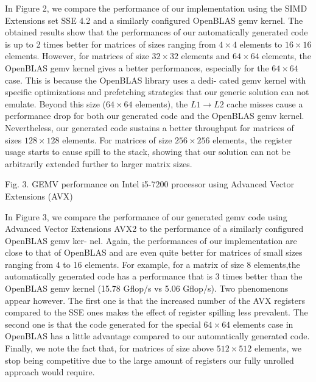 \documentclass[../main]{subfiles}
\begin{document}
In Figure 2, we compare the performance of our implementation
using the SIMD Extensions set SSE 4.2 and a similarly
configured OpenBLAS gemv kernel. The obtained results show
that the performances of our automatically generated code is
up to 2 times better for matrices of sizes ranging from $4 \times 4$
elements to $16 \times 16$ elements. However, for matrices of size
$32 \times 32$ elements and $64 \times 64$ elements, the OpenBLAS gemv
kernel gives a better performances, especially for the $64 \times 64$
case. This is because the OpenBLAS library uses a dedi-
cated gemv kernel with specific optimizations and prefetching
strategies that our generic solution can not emulate. Beyond
this size ($64 \times 64$ elements), the $L1 \rightarrow L2$ cache misses
cause a performance drop for both our generated code and
the OpenBLAS gemv kernel. Nevertheless, our generated code
sustains a better throughput for matrices of sizes $128 \times 128$
elements. For matrices of size $256 \times 256$ elements, the register
usage starts to cause spill to the stack, showing that our
solution can not be arbitrarily extended further to larger matrix sizes.


Fig. 3. GEMV performance on Intel i5-7200 processor using Advanced Vector
Extensions (AVX)

In Figure 3, we compare the performance of our generated
gemv code using Advanced Vector Extensions AVX2 to the
performance of a similarly configured OpenBLAS gemv ker-
nel. Again, the performances of our implementation are close
to that of OpenBLAS and are even quite better for matrices of
small sizes ranging from 4 to 16 elements. For example, for a
matrix of size 8 elements,the automatically generated code has
a performance that is 3 times better than the OpenBLAS gemv
kernel (15.78 Gflop/s vs 5.06 Gflop/s). Two phenomenons
appear however. The first one is that the increased number
of the AVX registers compared to the SSE ones makes the
effect of register spilling less prevalent. The second one is
that the code generated for the special $64 \times 64$ elements
case \cite{hpcs23} in OpenBLAS has a little advantage compared to
our automatically generated code. Finally, we note the fact
that, for matrices of size above $512 \times 512$ elements, we stop
being competitive due to the large amount of registers our
fully unrolled approach would require.
\end{document}
